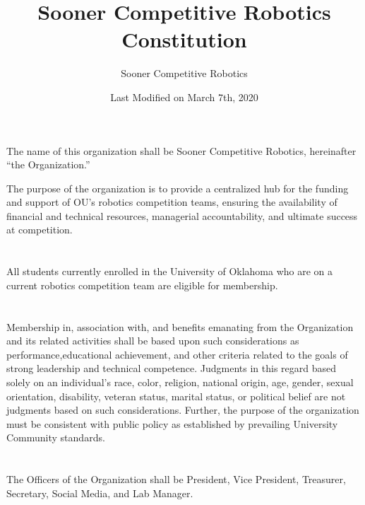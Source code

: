 \documentclass[12pt]{cls/constitution}
\begin{document}
\title{Sooner Competitive Robotics Constitution}
\author{Sooner Competitive Robotics}
\date{Last Modified on March 7th, 2020}
\maketitle
\setcounter{tocdepth}{0}
\tableofcontents
\newpage


The name of this organization shall be Sooner Competitive Robotics,  hereinafter “the Organization.”


The purpose of the organization is to provide a centralized hub for the funding and support of OU's robotics competition teams, ensuring the availability of financial and technical resources, managerial accountability, and ultimate success at competition. 


\section{}
All students currently enrolled in the University of Oklahoma who are on a current robotics competition team are eligible for membership. 

\section{}
Membership in, association with, and benefits emanating from the Organization and its related activities shall be based upon such considerations as performance,educational achievement, and other criteria related to the goals of strong leadership and technical competence. Judgments in this regard based solely on an individual’s race, color, religion, national origin, age, gender, sexual orientation, disability, veteran status, marital status, or political belief are not judgments based on such considerations. Further, the purpose of the organization must be consistent with public policy as established by prevailing University Community standards.  


\section{}
The Officers of the Organization shall be President, Vice President, Treasurer, Secretary, Social Media, and Lab Manager.
\end{document}
